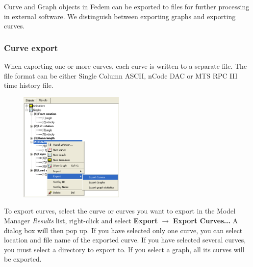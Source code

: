 \vskip-3mm

\vskip-3mm



Curve and Graph objects in Fedem can be exported to files
for further processing in external software.
We distinguish between exporting graphs and exporting curves.

\subsubsection{Curve export}

When exporting one or more curves, each curve is written to a separate file.
The file format can be either Single Column ASCII, nCode DAC or MTS RPC III
time history file.

\begin{figure}
  \vspace{-5mm}
  \includegraphics[width=0.46\textwidth]{Figures/7-CurveExport}
\end{figure}

To export curves, select the curve or curves you want to export in
the Model Manager {\sl Results} list, right-click and select
\textbf{Export} $\rightarrow$ \textbf{Export Curves...}
A dialog box will then pop up. If you have selected only one curve,
you can select location and file name of the exported curve.
If you have selected several curves, you must select a directory to export to.
If you select a graph, all its curves will be exported.

